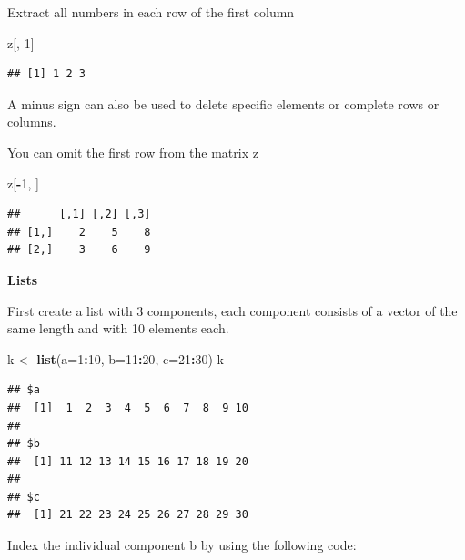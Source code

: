 \documentclass[
]{book}
\newenvironment{Shaded}{\begin{snugshade}}{\end{snugshade}}
\newcommand{\DataTypeTok}[1]{\textcolor[rgb]{0.13,0.29,0.53}{#1}}
\newcommand{\DecValTok}[1]{\textcolor[rgb]{0.00,0.00,0.81}{#1}}
\newcommand{\KeywordTok}[1]{\textcolor[rgb]{0.13,0.29,0.53}{\textbf{#1}}}
\newcommand{\NormalTok}[1]{#1}
\newcommand{\OperatorTok}[1]{\textcolor[rgb]{0.81,0.36,0.00}{\textbf{#1}}}
\newcommand{\StringTok}[1]{\textcolor[rgb]{0.31,0.60,0.02}{#1}}
\begin{document}
Extract all numbers in each row of the first column

\begin{Shaded}
\begin{Highlighting}[]
\NormalTok{z[, }\DecValTok{1}\NormalTok{]}
\end{Highlighting}
\end{Shaded}

\begin{verbatim}
## [1] 1 2 3
\end{verbatim}

A minus sign can also be used to delete specific elements or complete rows or columns.

You can omit the first row from the matrix z

\begin{Shaded}
\begin{Highlighting}[]
\NormalTok{z[}\OperatorTok{-}\DecValTok{1}\NormalTok{, ]}
\end{Highlighting}
\end{Shaded}

\begin{verbatim}
##      [,1] [,2] [,3]
## [1,]    2    5    8
## [2,]    3    6    9
\end{verbatim}

\textbf{Lists}

First create a list with 3 components, each component consists of a vector of the same length and with 10 elements each.

\begin{Shaded}
\begin{Highlighting}[]
\NormalTok{k <-}\StringTok{ }\KeywordTok{list}\NormalTok{(}\DataTypeTok{a=}\DecValTok{1}\OperatorTok{:}\DecValTok{10}\NormalTok{, }\DataTypeTok{b=}\DecValTok{11}\OperatorTok{:}\DecValTok{20}\NormalTok{, }\DataTypeTok{c=}\DecValTok{21}\OperatorTok{:}\DecValTok{30}\NormalTok{)}
\NormalTok{k}
\end{Highlighting}
\end{Shaded}

\begin{verbatim}
## $a
##  [1]  1  2  3  4  5  6  7  8  9 10
## 
## $b
##  [1] 11 12 13 14 15 16 17 18 19 20
## 
## $c
##  [1] 21 22 23 24 25 26 27 28 29 30
\end{verbatim}

Index the individual component b by using the following code:

\begin{Shaded}
\end{Shaded}
\end{document}
